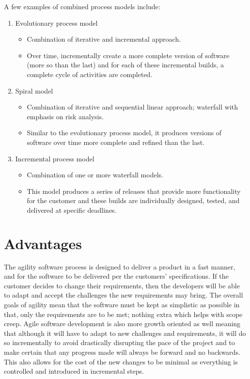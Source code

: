 	A few examples of combined process models include:
	\begin{enumerate}
		\item Evolutionary process model
			\begin{itemize}
				\item Combination of iterative and incremental approach.
				\item Over time, incrementally create a more complete version of software (more so than the last) and for each of these incremental builds, a complete cycle of activities are completed.
			\end{itemize}
		\item Spiral model
			\begin{itemize}
				\item Combination of iterative and sequential linear approach; waterfall with emphasis on risk analysis.
				\item Similar to the evolutionary process model, it produces versions of software over time more complete and refined than the last.
			\end{itemize}
		\item Incremental process model
			\begin{itemize}
				\item Combination of one or more waterfall models.
				\item This model produces a series of releases that provide more functionality for the customer and these builds are individually designed, tested, and delivered at specific deadlines.
			\end{itemize}
	\end{enumerate}


\newpage
{}
	\part{Advantages}


	The agility software process is designed to deliver a product in a fast manner, and for the software to be delivered per the customers' specifications. If the customer decides to change their requirements, then the developers will be able to adapt and accept the challenges the new requirements may bring. The overall goals of agility mean that the software must be kept as simplistic as possible in that, only the requirements are to be met; nothing extra which helps with scope creep. Agile software development is also more growth oriented as well meaning that although it will have to adapt to new challenges and requirements, it will do so incrementally to avoid drastically disrupting the pace of the project and to make certain that any progress made will always be forward and no backwards. This also allows for the cost of the new changes to be minimal as everything is controlled and introduced in incremental steps.

